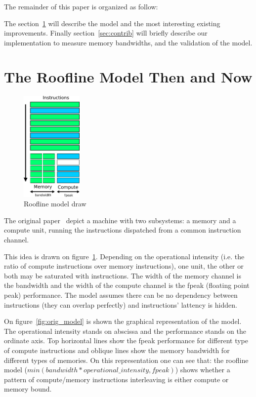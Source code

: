 \documentclass[runningheads,a4paper]{llncs}
\begin{document}

The remainder of this paper is organized as follow:

The section~\ref{sec:state_of_art} will describe the model and the most interesting existing improvements.
Finally section~\ref{sec:contrib} will briefly describe our implementation to measure memory bandwidths, and the validation of the model.

\section{The Roofline Model Then and Now}
\label{sec:state_of_art}

\begin{figure}
  \centering
  \includegraphics[width=30mm]{pictures/model_drawing}
  \caption{Roofline model draw}
  \label{fig:roofline_draw}
\end{figure}

The original paper~\cite{Williams:2009:RIV:1498765.1498785} depict a machine with two subsystems: a memory and a compute unit,
running the instructions dispatched from a common instruction channel.

This idea is drawn on figure~\ref{fig:roofline_draw}.
Depending on the operational intensity (i.e. the ratio of compute instructions over memory instructions),
one unit, the other or both may be saturated with instructions. The width of the memory channel is the bandwidth and the width
of the compute channel is the fpeak (floating point peak) performance. The model assumes there can be no dependency between
instructions (they can overlap perfectly) and instructions' lattency is hidden.

On figure~\ref{fig:orig_model} is shown the graphical representation of the model.
The operational intensity stands on abscissa and the performance stands on the ordinate axis.
Top horizontal lines show the fpeak performance for different type of compute instructions and
oblique lines show the memory bandwidth for different types of memories. On this representation
one can see that: the roofline model ($min(bandwidth*operational\_intensity, fpeak)$) shows whether a pattern of compute/memory
instructions interleaving is either compute or memory bound.
\end{document}
